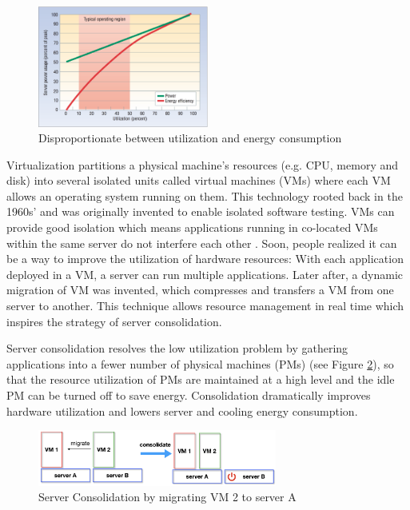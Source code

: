 \begin{figure}[H]
	\centering
	\includegraphics[width=0.5\textwidth]{pics/util.png}
	\caption{Disproportionate between utilization and energy consumption \cite{Barroso:2007jt}}
	\label{fig:unproportional}
\end{figure} 

Virtualization \cite{Uhlig:2005do} partitions a physical machine's resources (e.g. CPU, memory and disk) into several isolated units called virtual machines (VMs) where each VM allows an operating system running on them. This technology rooted back in the 1960s' and was originally invented to enable isolated software testing. VMs can provide good isolation which means applications running in co-located VMs within the same server do not interfere each other \cite{Somani:2009ho}.  Soon, people realized it can be a way to improve the utilization of hardware resources: With each application deployed in a VM, a server can run multiple applications. Later after, a dynamic migration of VM was invented, which compresses and transfers a VM from one server to another. This technique allows resource management in real time which inspires the strategy of server consolidation. 



Server consolidation \cite{Zhang:2010vo} resolves the low utilization problem by gathering applications into a fewer number of physical machines (PMs) (see Figure \ref{fig:unproportional}), so that the resource utilization of PMs are maintained at a high level and the idle PM can be turned off to save energy. Consolidation dramatically improves hardware utilization and lowers server and cooling energy consumption. 

\begin{figure}
	\centering
	\includegraphics[width=0.7\textwidth]{pics/consolidate.png}
	\caption{Server Consolidation by migrating VM 2 to server A \cite{Barroso:2007jt}}
	\label{fig:unproportional}
\end{figure} 

